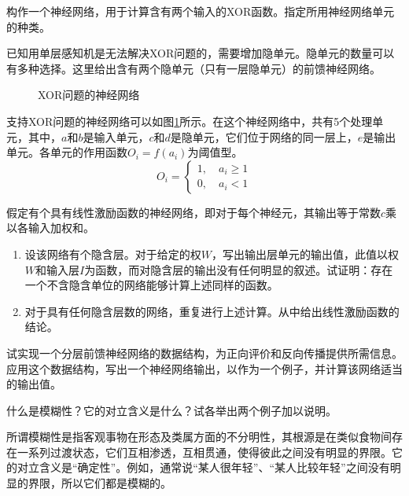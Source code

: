 \begin{question}
构作一个神经网络，用于计算含有两个输入的XOR函数。指定所用神经网络单元的种类。
\end{question}
\begin{solution}
已知用单层感知机是无法解决XOR问题的，需要增加隐单元。隐单元的数量可以有多种选择。这里给出含有两个隐单元（只有一层隐单元）的前馈神经网络。\par 
	\begin{figure}[h]
		\centering
		
		\caption{XOR问题的神经网络} \label{Fig:NN-XOR}
	\end{figure}
支持XOR问题的神经网络可以如图\ref{Fig:NN-XOR}所示。在这个神经网络中，共有5个处理单元，其中，$a$和$b$是输入单元，$c$和$d$是隐单元，它们位于网络的同一层上，$e$是输出单元。各单元的作用函数$O_i = f(a_i)$为阈值型。
\[O_i = \begin{cases}
	1, \quad a_i \geq 1 \\
	0, \quad a_i < 1
\end{cases} \]
\end{solution}

\begin{question}
假定有个具有线性激励函数的神经网络，即对于每个神经元，其输出等于常数$c$乘以各输入加权和。
	\begin{enumerate}
		\item 设该网络有个隐含层。对于给定的权$W$，写出输出层单元的输出值，此值以权$W$和输入层$I$为函数，而对隐含层的输出没有任何明显的叙述。试证明：存在一个不含隐含单位的网络能够计算上述同样的函数。
		\item 对于具有任何隐含层数的网络，重复进行上述计算。从中给出线性激励函数的结论。
	\end{enumerate}
\end{question}
\begin{solution}
\end{solution}

\begin{question}
试实现一个分层前馈神经网络的数据结构，为正向评价和反向传播提供所需信息。应用这个数据结构，写出一个神经网络输出，以作为一个例子，并计算该网络适当的输出值。
\end{question}
\begin{solution}
\end{solution}

\begin{question}
什么是模糊性？它的对立含义是什么？试各举出两个例子加以说明。
\end{question}
\begin{solution}
所谓模糊性是指客观事物在形态及类属方面的不分明性，其根源是在类似食物间存在一系列过渡状态，它们互相渗透，互相贯通，使得彼此之间没有明显的界限。它的对立含义是``确定性''。例如，通常说``某人很年轻''、``某人比较年轻''之间没有明显的界限，所以它们都是模糊的。
\end{solution}

